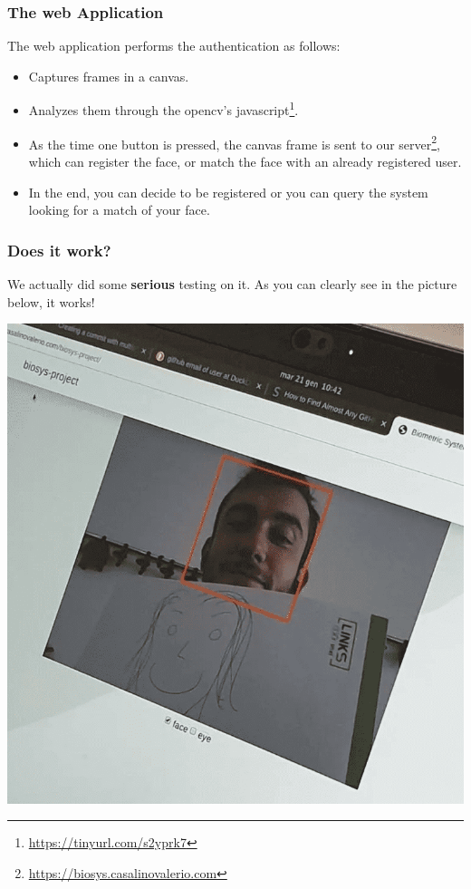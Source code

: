 \begin{frame} \frametitle{The web Application}

	The web application performs the authentication as follows:
	
	\vfill

	\begin{itemize}
	 	\item Captures frames in a canvas.
	 	\item Analyzes them through the opencv's javascript\footnote{{ \color{red}
	 	\url{https://tinyurl.com/s2yprk7}}}.
	 	\item As the time one button is pressed, the canvas frame is sent to our
	 	server\footnote{{ \color{red} \url{https://biosys.casalinovalerio.com}}},
	 	which can register the face, or match the face with an already registered
	 	user.
	 	\item In the end, you can decide to be registered or you can query the
	 	system looking for a match of your face.
	\end{itemize}
	 
	\vfill

\end{frame}

\begin{frame} \frametitle{Does it work?}

	We actually did some \textbf{serious} testing on it. As you can
	clearly see in the picture below, it works!
	\begin{center}
		\includegraphics[width=.45\textwidth]{img/serious-testing}
	\end{center}
	

\end{frame}